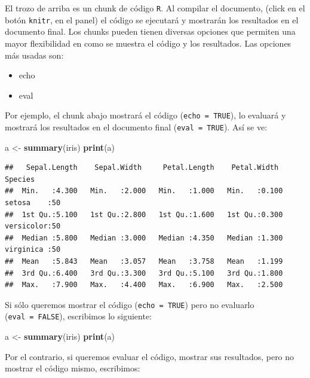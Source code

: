 \documentclass[
]{article}
\newenvironment{Shaded}{\begin{snugshade}}{\end{snugshade}}
\newcommand{\KeywordTok}[1]{\textcolor[rgb]{0.13,0.29,0.53}{\textbf{#1}}}
\newcommand{\NormalTok}[1]{#1}
\newcommand{\StringTok}[1]{\textcolor[rgb]{0.31,0.60,0.02}{#1}}
\providecommand{\tightlist}{%
  \setlength{\itemsep}{0pt}\setlength{\parskip}{0pt}}
\begin{document}
El trozo de arriba es un chunk de código \texttt{R}. Al compilar el
documento, (click en el botón \texttt{knitr}, en el panel) el código se
ejecutará y mostrarán los resultados en el documento final. Los chunks
pueden tienen diversas opciones que permiten una mayor flexibilidad en
como se muestra el código y los resultados. Las opciones más usadas son:

\begin{itemize}
\tightlist
\item
  echo
\item
  eval
\end{itemize}

Por ejemplo, el chunk abajo mostrará el código (\texttt{echo\ =\ TRUE}),
lo evaluará y mostrará los resultados en el documento final
(\texttt{eval\ =\ TRUE}). Así se ve:

\begin{Shaded}
\begin{Highlighting}[]
\NormalTok{a <-}\StringTok{ }\KeywordTok{summary}\NormalTok{(iris)}
\KeywordTok{print}\NormalTok{(a)}
\end{Highlighting}
\end{Shaded}

\begin{verbatim}
##   Sepal.Length    Sepal.Width     Petal.Length    Petal.Width          Species  
##  Min.   :4.300   Min.   :2.000   Min.   :1.000   Min.   :0.100   setosa    :50  
##  1st Qu.:5.100   1st Qu.:2.800   1st Qu.:1.600   1st Qu.:0.300   versicolor:50  
##  Median :5.800   Median :3.000   Median :4.350   Median :1.300   virginica :50  
##  Mean   :5.843   Mean   :3.057   Mean   :3.758   Mean   :1.199                  
##  3rd Qu.:6.400   3rd Qu.:3.300   3rd Qu.:5.100   3rd Qu.:1.800                  
##  Max.   :7.900   Max.   :4.400   Max.   :6.900   Max.   :2.500
\end{verbatim}

Si sólo queremos mostrar el código (\texttt{echo\ =\ TRUE}) pero no
evaluarlo (\texttt{eval\ =\ FALSE}), escribimos lo siguiente:

\begin{Shaded}
\begin{Highlighting}[]
\NormalTok{a <-}\StringTok{ }\KeywordTok{summary}\NormalTok{(iris)}
\KeywordTok{print}\NormalTok{(a)}
\end{Highlighting}
\end{Shaded}

Por el contrario, si queremos evaluar el código, mostrar sus resultados,
pero no mostrar el código mismo, escribimos:
\end{document}

